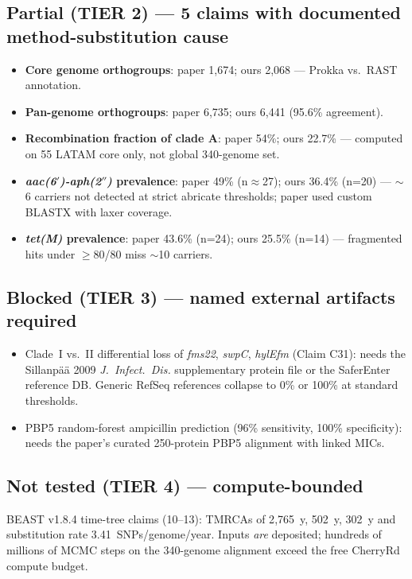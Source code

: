 \documentclass[11pt,letterpaper]{article}
\begin{document}
\subsection{Partial (TIER 2) --- 5 claims with documented method-substitution cause}
\begin{itemize}[leftmargin=1.2em]
  \item \textbf{Core genome orthogroups}: paper 1{,}674; ours 2{,}068 --- Prokka vs.\ RAST annotation.
  \item \textbf{Pan-genome orthogroups}: paper 6{,}735; ours 6{,}441 (95.6\% agreement).
  \item \textbf{Recombination fraction of clade A}: paper 54\%; ours 22.7\% --- computed on 55 LATAM core only, not global 340-genome set.
  \item \textbf{\emph{aac(6$'$)-aph(2$''$)} prevalence}: paper 49\% (n$\approx$27); ours 36.4\% (n=20) --- $\sim$6 carriers not detected at strict abricate thresholds; paper used custom BLASTX with laxer coverage.
  \item \textbf{\emph{tet(M)} prevalence}: paper 43.6\% (n=24); ours 25.5\% (n=14) --- fragmented hits under $\geq$80/80 miss $\sim$10 carriers.
\end{itemize}

\subsection{Blocked (TIER 3) --- named external artifacts required}
\begin{itemize}[leftmargin=1.2em]
  \item Clade~I vs.\ II differential loss of \emph{fms22}, \emph{swpC}, \emph{hylEfm} (Claim C31): needs the Sillanp\"a\"a 2009 \emph{J.\ Infect.\ Dis.} supplementary protein file or the SaferEnter reference DB. Generic RefSeq references collapse to 0\% or 100\% at standard thresholds.
  \item PBP5 random-forest ampicillin prediction (96\% sensitivity, 100\% specificity): needs the paper's curated 250-protein PBP5 alignment with linked MICs.
\end{itemize}

\subsection{Not tested (TIER 4) --- compute-bounded}
BEAST v1.8.4 time-tree claims (10--13): TMRCAs of 2{,}765~y, 502~y, 302~y and substitution rate 3.41~SNPs/genome/year. Inputs \emph{are} deposited; hundreds of millions of MCMC steps on the 340-genome alignment exceed the free CherryRd compute budget.
\end{document}
